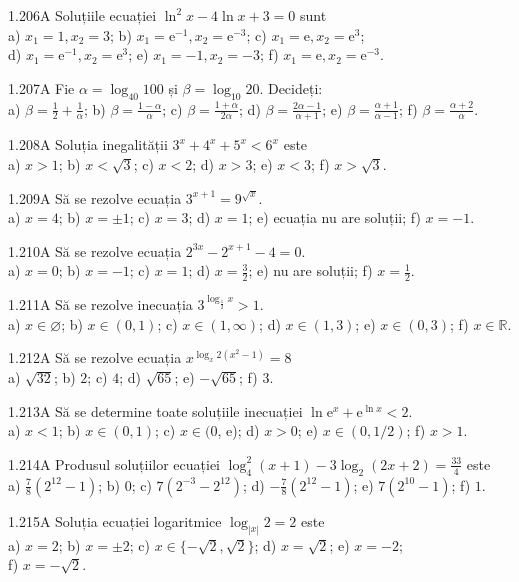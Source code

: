 \documentclass[11pt]{article}
\begin{document}
1.206A Soluțiile ecuației $\ln ^{2} x-4 \ln x+3=0$ sunt\\ a) $x_{1}=1, x_{2}=3$; b) $x_{1}=\mathrm{e}^{-1}, x_{2}=\mathrm{e}^{-3}$; c) $x_{1}=\mathrm{e}, x_{2}=\mathrm{e}^{3}$;\\ d) $x_{1}=\mathrm{e}^{-1}, x_{2}=\mathrm{e}^{3}$; e) $x_{1}=-1, x_{2}=-3$; f) $x_{1}=\mathrm{e}, x_{2}=\mathrm{e}^{-3}$.

1.207A Fie $\alpha=\log _{40} 100$ și $\beta=\log _{10} 20$. Decideți:\\ a) $\beta=\frac{1}{2}+\frac{1}{\alpha}$; b) $\beta=\frac{1-\alpha}{\alpha}$; c) $\beta=\frac{1+\alpha}{2 \alpha}$; d) $\beta=\frac{2 \alpha-1}{\alpha+1}$; e) $\beta=\frac{\alpha+1}{\alpha-1}$; f) $\beta=\frac{\alpha+2}{\alpha}$.

1.208A Soluția inegalității $3^{x}+4^{x}+5^{x}<6^{x}$ este\\ a) $x>1$; b) $x<\sqrt{3}$; c) $x<2$; d) $x>3$; e) $x<3$; f) $x>\sqrt{3}$.

1.209A Să se rezolve ecuația $3^{x+1}=9^{\sqrt{x}}$.\\ a) $x=4$; b) $x= \pm 1$; c) $x=3$; d) $x=1$; e) ecuația nu are soluții; f) $x=-1$.

1.210A Să se rezolve ecuația $2^{3 x}-2^{x+1}-4=0$.\\ a) $x=0$; b) $x=-1$; c) $x=1$; d) $x=\frac{3}{2}$; e) nu are soluții; f) $x=\frac{1}{2}$.

1.211A Să se rezolve inecuația $3^{\log _{\frac{1}{2}} x}>1$.\\ a) $x \in \varnothing$; b) $x \in(0,1)$; c) $x \in(1, \infty)$; d) $x \in(1,3)$; e) $x \in(0,3)$; f) $x \in \mathbb{R}$.

1.212A Să se rezolve ecuația $x^{\log _{x} 2\left(x^{2}-1\right)}=8$\\ a) $\sqrt{32}$; b) $2$; c) $4$; d) $\sqrt{65}$; e) $-\sqrt{65}$; f) $3$.

1.213A Să se determine toate soluțiile inecuației $\ln \mathrm{e}^{x} + \mathrm{e}^{\ln x}<2$.\\ a) $x<1$; b) $x \in(0,1)$; c) $x \in(0$, e); d) $x>0$; e) $x \in(0,1 / 2)$; f) $x>1$.

1.214A Produsul soluțiilor ecuației $\log _{4}^{2}(x+1)-3 \log _{2}(2 x+2)=\frac{33}{4}$ este\\ a) $\frac{7}{8}\left(2^{12}-1\right)$; b) $0$; c) $7\left(2^{-3}-2^{12}\right)$; d) $-\frac{7}{8}\left(2^{12}-1\right)$; e) $7\left(2^{10}-1\right)$; f) $1$.

1.215A Soluția ecuației logaritmice $\log _{|x|} 2=2$ este\\ a) $x=2$; b) $x= \pm 2$; c) $x \in\{-\sqrt{2}, \sqrt{2}\}$; d) $x=\sqrt{2}$; e) $x=-2$;\\ f) $x=-\sqrt{2}$.
\end{document}
